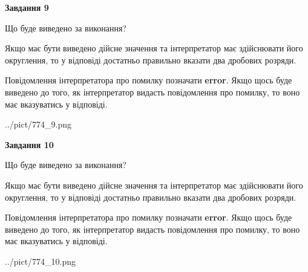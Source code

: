\documentclass[12pt, ukrainian]{article}
\begin{document}
{\begin {Large}
{\begin {center}\textbf{Завдання 9}\end {center}}\par
Що буде виведено за виконання? \par

Якщо має бути виведено дійсне значення та інтерпретатор має здійснювати його округлення, 
то у відповіді достатньо правильно вказати два дробових розряди.

Повідомлення інтерпретатора про помилку позначати \textbf{error}.
Якщо щось буде виведено до того, як інтерпретатор видасть повідомлення про помилку, 
то воно має вказуватись у відповіді. \par

\begin{center}
	{../pict/774_9.png}
\end{center}
\newpage

{\begin {center}\textbf{Завдання 10}\end {center}}\par
Що буде виведено за виконання? \par

Якщо має бути виведено дійсне значення та інтерпретатор має здійснювати його округлення, 
то у відповіді достатньо правильно вказати два дробових розряди.

Повідомлення інтерпретатора про помилку позначати \textbf{error}.
Якщо щось буде виведено до того, як інтерпретатор видасть повідомлення про помилку, 
то воно має вказуватись у відповіді. \par

\begin{center}
	{../pict/774_10.png}
\end{center}
\newpage

\end {Large}}
\end{document}
